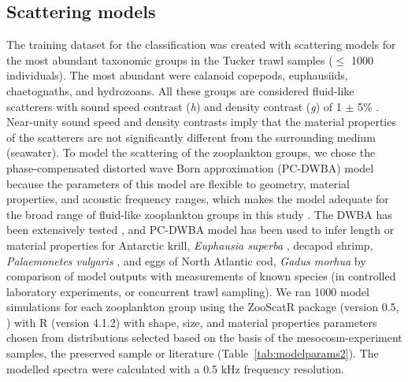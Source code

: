 \subsection{Scattering models}
The training dataset for the classification was created with scattering models for the most abundant taxonomic groups in the Tucker trawl samples ($\leq$ 1000 individuals). The most abundant were calanoid copepods, euphausiids, chaetognaths, and hydrozoans. All these groups are considered fluid-like scatterers with sound speed contrast (\textit{h}) and density contrast (\textit{g}) of 1 $\pm$ 5\% \citep{Stanton2000b}. Near-unity sound speed and density contrasts imply that the material properties of the scatterers are not significantly different from the surrounding medium (seawater). To model the scattering of the zooplankton groups, we chose the phase-compensated distorted wave Born approximation (PC-DWBA) model because the parameters of this model are flexible to geometry, material properties, and acoustic frequency ranges, which makes the model adequate for the broad range of fluid-like zooplankton groups in this study \citep{Chu1999, Gastauer2019}. The DWBA has been extensively tested \citep{Lavery2007}, and PC-DWBA model has been used to infer length or material properties for Antarctic krill, \textit{Euphausia superba} \citep{Amakasu2017}, decapod shrimp, \textit{Palaemonetes vulgaris} \citep{Chu2000}, and eggs of North Atlantic cod, \textit{Gadus morhua} \citep{Chu2003} by comparison of model outputs with measurements of known species (in controlled laboratory experiments, or concurrent trawl sampling). We ran 1000 model simulations for each zooplankton group using the ZooScatR package (version 0.5, \citealt{Gastauer2019}) with R (version 4.1.2) with shape, size, and material properties parameters chosen from distributions selected based on the basis of the mesocosm-experiment samples, the preserved sample or literature (Table~\ref{tab:modelparams2}). The modelled spectra were calculated with a 0.5 kHz frequency resolution.

